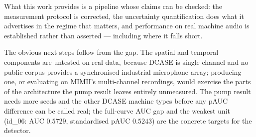 \documentclass[11pt]{article}
\begin{document}
What this work provides is a pipeline whose claims can be checked: the
measurement protocol is corrected, the uncertainty quantification does what it
advertises in the regime that matters, and performance on real machine audio is
established rather than asserted --- including where it falls short.

The obvious next steps follow from the gap. The spatial and temporal components
are untested on real data, because DCASE is single-channel and no public corpus
provides a synchronised industrial microphone array; producing one, or
evaluating on MIMII's multi-channel recordings, would exercise the parts of the
architecture the pump result leaves entirely unmeasured. The pump result needs
more seeds and the other DCASE machine types before any pAUC difference can be
called real; the full-curve AUC gap and the weakest unit (id\_06: AUC $0.5729$,
standardised pAUC $0.5243$) are the concrete targets for the detector.
\end{document}
